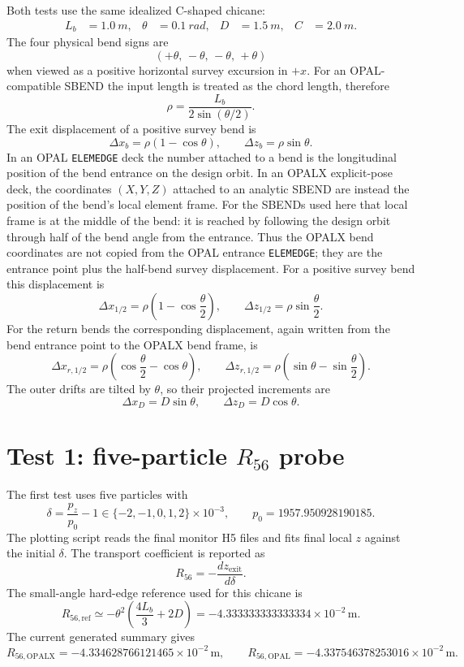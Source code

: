 \documentclass[11pt,a4paper]{article}
\begin{document}
Both tests use the same idealized C-shaped chicane:
\begin{align}
  L_b &= \SI{1.0}{m}, &
  \theta &= \SI{0.1}{rad}, &
  D &= \SI{1.5}{m}, &
  C &= \SI{2.0}{m}.
\end{align}
The four physical bend signs are
\[
  (+\theta,\,-\theta,\,-\theta,\,+\theta)
\]
when viewed as a positive horizontal survey excursion in \(+x\).
For an OPAL-compatible SBEND the input length is treated as the chord length,
therefore
\[
  \rho = \frac{L_b}{2\sin(\theta/2)}.
\]
The exit displacement of a positive survey bend is
\[
  \Delta x_b = \rho\left(1-\cos\theta\right), \qquad
  \Delta z_b = \rho\sin\theta .
\]
In an OPAL \texttt{ELEMEDGE} deck the number attached to a bend is the
longitudinal position of the bend entrance on the design orbit.  In an OPALX
explicit-pose deck, the coordinates \((X,Y,Z)\) attached to an analytic SBEND
are instead the position of the bend's local element frame.  For the SBENDs
used here that local frame is at the middle of the bend: it is reached by
following the design orbit through half of the bend angle from the entrance.
Thus the OPALX bend coordinates are not copied from the OPAL entrance
\texttt{ELEMEDGE}; they are the entrance point plus the half-bend survey
displacement.  For a positive survey bend this displacement is
\[
  \Delta x_{1/2} = \rho\left(1-\cos\frac{\theta}{2}\right), \qquad
  \Delta z_{1/2} = \rho\sin\frac{\theta}{2}.
\]
For the return bends the corresponding displacement, again written from the
bend entrance point to the OPALX bend frame, is
\[
  \Delta x_{r,1/2} = \rho\left(\cos\frac{\theta}{2}-\cos\theta\right), \qquad
  \Delta z_{r,1/2} = \rho\left(\sin\theta-\sin\frac{\theta}{2}\right).
\]
The outer drifts are tilted by \(\theta\), so their projected increments are
\[
  \Delta x_D = D\sin\theta, \qquad
  \Delta z_D = D\cos\theta .
\]

\section{Test 1: five-particle \(R_{56}\) probe}

The first test uses five particles with
\[
  \delta = \frac{p_z}{p_0} - 1
      \in \{-2, -1, 0, 1, 2\}\times 10^{-3},
  \qquad
  p_0 = 1957.950928190185 .
\]
The plotting script reads the final monitor H5 files and fits final local
\(z\) against the initial \(\delta\).  The transport coefficient is reported
as
\[
  R_{56} = -\frac{d z_{\mathrm{exit}}}{d\delta}.
\]
The small-angle hard-edge reference used for this chicane is
\[
  R_{56,\mathrm{ref}}
    \simeq
    -\theta^2\left(\frac{4L_b}{3}+2D\right)
    =
    -4.333333333333334\times 10^{-2}\,\mathrm{m}.
\]
The current generated summary gives
\[
  R_{56,\mathrm{OPALX}} = -4.334628766121465\times 10^{-2}\,\mathrm{m},
  \qquad
  R_{56,\mathrm{OPAL}} = -4.337546378253016\times 10^{-2}\,\mathrm{m}.
\]
\end{document}
